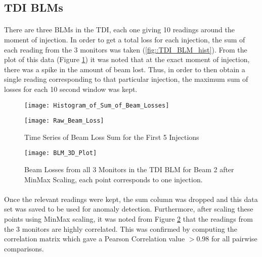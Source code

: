 \subsection{\acs{TDI} \acs{BLM}s}
\paragraph{ }There are three \acs{BLM}s in the \acs{TDI}, each one giving 10 readings around the moment of injection. In order to get a total loss for each injection, the sum of each reading from the 3 monitors was taken (\ref{fig::TDI_BLM_hist}). From the plot of this data (Figure \ref{fig::Raw_TDI_BLM}) it was noted that at the exact moment of injection, there was a spike in the amount of beam lost. Thus, in order to then obtain a single reading corresponding to that particular injection, the maximum sum of losses for each 10 second window was kept. 

\begin{figure}[!t]
	\begin{minipage}[b]{0.475\linewidth}
		\centering
		\texttt{[image: Histogram\_of\_Sum\_of\_Beam\_Losses]}
		\caption[BLM Histogram]{Histogram of Sum of Losses for Beam 1}
		\label{fig::TDI_BLM_hist}
	\end{minipage}	
	\hspace{0.25cm}
	\begin{minipage}[b]{0.475\linewidth}
		\centering
		\texttt{[image: Raw\_Beam\_Loss]}
		\caption[BLM Time Series]{Time Series of Beam Loss Sum for the First 5 Injections}
		\label{fig::Raw_TDI_BLM}
	\end{minipage}	
\end{figure}

\begin{figure}[b]
	\centering
	\texttt{[image: BLM\_3D\_Plot]}
	\caption[BLM Correlation Plot]{Beam Losses from all 3 Monitors in the TDI BLM for Beam 2 after MinMax Scaling, each point corresponds to one injection.}
	\label{fig::TDI_BLM_3D}
\end{figure}  

\paragraph{ }Once the relevant readings were kept, the sum column was dropped and this data set was saved to be used for anomaly detection. Furthermore, after scaling these points using MinMax scaling, it was noted from Figure \ref{fig::TDI_BLM_3D} that the readings from the 3 monitors are highly correlated. This was confirmed by computing the correlation matrix which gave a Pearson Correlation value $> 0.98$ for all pairwise comparisons.

